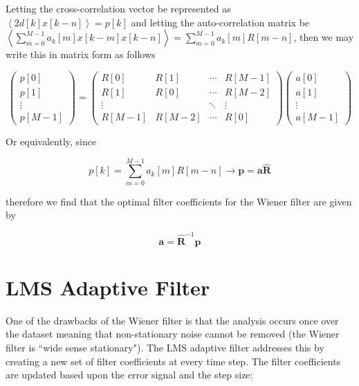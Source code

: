 \documentclass{article}
\begin{document}
Letting the cross-correlation vector be represented as $\left<2d[k]x[k-n]\right>=p[k]$
and letting the auto-correlation matrix be
$\left<\sum_{m=0}^{M-1} a_k[m]x[k-m] x[k-n]\right> = \sum_{m=0}^{M-1} a_k[m]R[m-n]$,
then we may write this in matrix form as follows

\begin{equation}
    \begin{pmatrix}
        p[0]\\
        p[1]\\
        \vdots\\
        p[M-1]
    \end{pmatrix}
    =
    \begin{pmatrix}
        R[0] & R[1] & \cdots & R[M-1]\\
        R[1] & R[0] & \cdots & R[M-2]\\
        \vdots & & \ddots & \vdots\\
        R[M-1] & R[M-2] & \cdots & R[0]
    \end{pmatrix}
    \begin{pmatrix}
        a[0]\\
        a[1]\\
        \vdots\\
        a[M-1]
    \end{pmatrix}
\end{equation}

Or equivalently, since

\begin{equation}
    p[k] = \sum_{m=0}^{M-1} a_k[m]R[m-n] \to \mathbf{p} = \mathbf{a} \hat{\mathbf{R}}
\end{equation}

therefore we find that the optimal filter coefficients for the Wiener filter are
given by

\begin{equation}
    \mathbf{a} = \hat{\mathbf{R}}^{-1} \mathbf{p}
\end{equation}


\section{LMS Adaptive Filter}
One of the drawbacks of the Wiener filter is that the analysis occurs once over
the dataset meaning that non-stationary noise cannot be removed (the Wiener
filter is ``wide sense stationary"). The LMS adaptive filter addresses this by
creating a new set of filter coefficients at every time step. The filter
coefficients are updated based upon the error signal and the step size:
\end{document}
